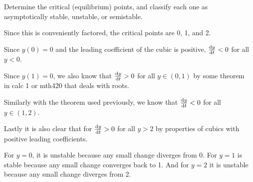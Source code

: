 Determine the critical (equilibrium) points, and classify each one as asymptotically stable, unstable, or semistable.

\soln Since this is conveniently factored, the critical points are 0, 1, and 2.

\nl Since $y(0) = 0$ and the leading coefficient of the cubic is positive, $\dv{y}{t} < 0$ for all $y < 0$.  

\nl Since $y(1) = 0$, we also know that $\dv{y}{t} > 0$ for all $y \in (0, 1)$ by some theorem in calc 1 or mth420 that deals with roots.

\nl Similarly with the theorem used previously, we know that $\dv{y}{t} < 0$ for all $y \in (1,2)$.

\nl Lastly it is also clear that for $\dv{y}{t} > 0$ for all $y > 2$ by properties of cubics with positive leading coefficients.

\nnl For $y = 0$, it is unstable because any small change diverges from 0. For $y=1$ is stable because any small change converges back to 1. And for $y=2$ it is unstable because any small change diverges from 2.  